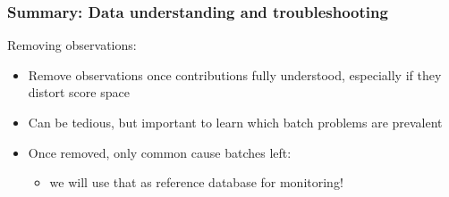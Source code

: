 \begin{frame}\frametitle{Summary: Data understanding and troubleshooting}

Removing observations:	
\begin{itemize}
	\item	Remove observations once contributions fully understood, especially if they distort score space
	
	\item	Can be tedious, but important to learn which batch problems are prevalent
	
	\item	Once removed, only common cause batches left:
	
			\begin{itemize}
				\item	we will use that as reference database for monitoring!
			\end{itemize}

\end{itemize}

\end{frame}